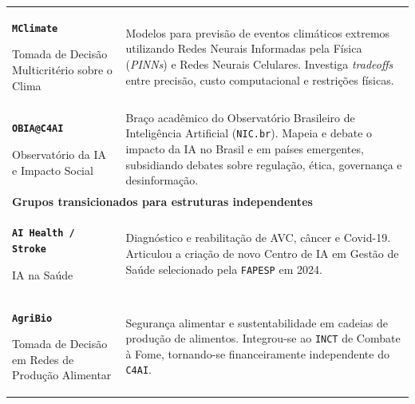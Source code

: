 \begin{longtable}{p{4cm}p{10cm}}
\addlinespace
\textbf{\texttt{MClimate}} \par Tomada de Decisão Multicritério sobre o Clima & Modelos para previsão de eventos climáticos extremos utilizando Redes Neurais Informadas pela Física (\emph{PINNs}) e Redes Neurais Celulares. Investiga \emph{tradeoffs} entre precisão, custo computacional e restrições físicas. \\
\addlinespace
\textbf{\texttt{OBIA@C4AI}} \par Observatório da IA e Impacto Social & Braço acadêmico do Observatório Brasileiro de Inteligência Artificial (\texttt{NIC.br}). Mapeia e debate o impacto da IA no Brasil e em países emergentes, subsidiando debates sobre regulação, ética, governança e desinformação. \\
\midrule
\multicolumn{2}{l}{\textbf{Grupos transicionados para estruturas independentes}} \\
\midrule
\textbf{\texttt{AI Health / Stroke}} \par IA na Saúde & Diagnóstico e reabilitação de AVC, câncer e Covid-19. Articulou a criação de novo Centro de IA em Gestão de Saúde selecionado pela \texttt{FAPESP} em 2024. \\
\addlinespace
\textbf{\texttt{AgriBio}} \par Tomada de Decisão em Redes de Produção Alimentar & Segurança alimentar e sustentabilidade em cadeias de produção de alimentos. Integrou-se ao \texttt{INCT} de Combate à Fome, tornando-se financeiramente independente do \texttt{C4AI}. \\
\end{longtable}

